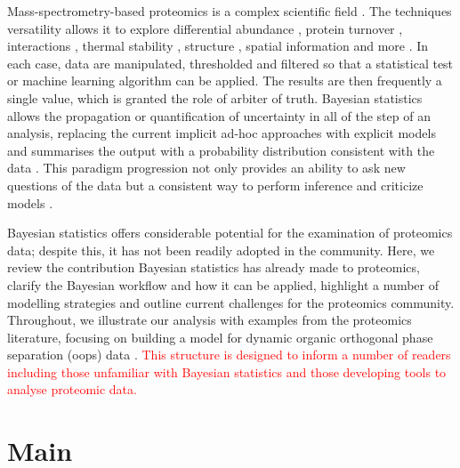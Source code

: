 \documentclass[12pt,english, journal=jpr, layout=twocolumn]{article}
\begin{document}
Mass-spectrometry-based proteomics is a complex scientific field \citep{Bantscheff::2007}. The techniques versatility allows it to explore differential abundance \citep{Bantscheff::2007}, protein turnover \citep{Mathieson::2018}, interactions \citep{Huttlin::2015}, thermal stability \citep{Mateus::2020}, structure \citep{Schopper::2017,Masson::2019}, spatial information \citep{Gessel::2014, Geladaki::2019, Barylyuk::2020} and more \citep{Toby::2016, Nightingale::2018, Johnson::2019}. In each case, data are manipulated, thresholded and filtered so that a statistical test or machine learning algorithm can be applied. The results are then frequently a single value, which is granted the role of arbiter of truth. Bayesian statistics allows the propagation or quantification of uncertainty in all of the step of an analysis, replacing the current implicit ad-hoc approaches with explicit models and summarises the output with a probability distribution consistent with the data \citep{Gelman::2020}. This paradigm progression not only provides an ability to ask new questions of the data but a consistent way to perform inference and criticize models \citep{Gelman::1995, Gelman::2020}. 

Bayesian statistics offers considerable potential for the examination of proteomics data; despite this, it has not been readily adopted in the community. Here, we review the contribution Bayesian statistics has already made to proteomics, clarify the Bayesian workflow and how it can be applied, highlight a number of modelling strategies and outline current challenges for the proteomics community. Throughout, we illustrate our analysis with examples from the proteomics literature, focusing on building a model for dynamic organic orthogonal phase separation (oops) data \citep{Queiroz::2019}. \textcolor{red}{This structure is designed to inform a number of readers including those unfamiliar with Bayesian statistics and those developing tools to analyse proteomic data.}




\section{Main}
\end{document}
